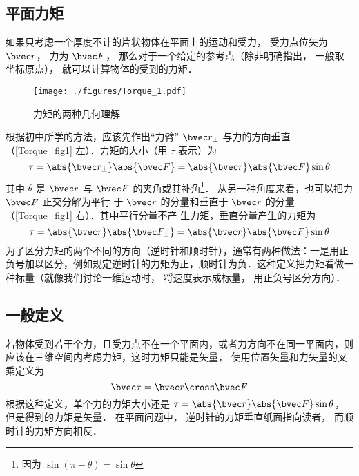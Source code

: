 

\subsection{平面力矩}

如果只考虑一个厚度不计的片状物体在平面上的运动和受力， 受力点位矢为 $\bvec r$， 力为 $\bvec F$， 那么对于一个给定的参考点（除非明确指出， 一般取坐标原点）， 就可以计算物体的受到的力矩．

\begin{figure}[ht]
\centering
\texttt{[image: ./figures/Torque\_1.pdf]}
\caption{力矩的两种几何理解}\label{Torque_fig1}
\end{figure}

根据初中所学的方法，应该先作出“力臂” $\bvec r_ \bot$ 与力的方向垂直（\autoref{Torque_fig1} 左）．力矩的大小（用 $\tau$ 表示）为
\begin{equation}\label{Torque_eq2}
\tau = \abs{\bvec r_ \bot } \abs{\bvec F} = \abs{\bvec r} \abs{\bvec F} \sin \theta 
\end{equation}
其中 $\theta $ 是 $\bvec r$ 与 $\bvec F$ 的夹角或其补角\footnote{因为 $\sin(\pi - \theta) = \sin\theta$}． 从另一种角度来看，也可以把力 $\bvec F$ 正交分解为平行
于 $\bvec r$ 的分量和垂直于 $\bvec r$ 的分量（\autoref{Torque_fig1} 右）．其中平行分量不产
生力矩，垂直分量产生的力矩为
\begin{equation}\label{Torque_eq1}
\tau = \abs{\bvec r} \abs{\bvec F_ \bot } = \abs{\bvec r} \abs{\bvec F} \sin \theta 
\end{equation}
为了区分力矩的两个不同的方向（逆时针和顺时针），通常有两种做法：一是用正负号加以区分，例如规定逆时针的力矩为正，顺时针为负．这种定义把力矩看做一种标量（就像我们讨论一维运动时， 将速度表示成标量， 用正负号区分方向）．

\subsection{一般定义}
若物体受到若干个力，且受力点不在一个平面内，或者力方向不在同一平面内，则应该在三维空间内考虑力矩，这时力矩只能是矢量， 使用位置矢量和力矢量的叉乘定义为
\begin{equation}\label{Torque_eq3}
\bvec \tau = \bvec r \cross \bvec F
\end{equation}
根据这种定义，单个力的力矩大小还是 $\tau = \abs{\bvec r} \abs{\bvec F}\sin \theta$， 但是得到的力矩是矢量． 在平面问题中， 逆时针的力矩垂直纸面指向读者， 而顺时针的力矩方向相反．

